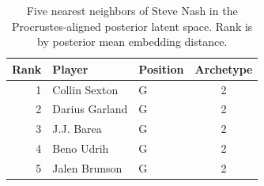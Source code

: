 \begin{table}[htbp]
  \centering\small
  \begin{tabular}{rllc}
    \toprule
    Rank & Player & Position & Archetype \\
    \midrule
    1 & Collin Sexton & G & 2 \\
    2 & Darius Garland & G & 2 \\
    3 & J.J. Barea & G & 2 \\
    4 & Beno Udrih & G & 2 \\
    5 & Jalen Brunson & G & 2 \\
    \bottomrule
  \end{tabular}
  \caption{Five nearest neighbors of Steve Nash in the Procrustes-aligned posterior latent space. Rank is by posterior mean embedding distance.}
  \label{tab:Steve_Nash_neighbors}
\end{table}

